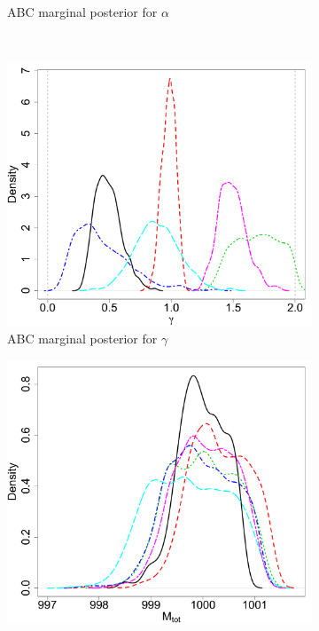 \documentclass[ejs]{imsart}
\numberwithin{equation}{section}
\theoremstyle{plain}
\begin{document}
\begin{figure}[htbp]
\begin{subfigure}{0.48\textwidth}
\caption{ABC marginal posterior for  $\alpha$}\label{subfig:marg_alpha} 
\end{subfigure} \\
\begin{subfigure}{0.48\textwidth}
\centering
\includegraphics[width = \textwidth]{figures/marg_gamma.pdf} 
\caption{ABC marginal posterior for $\gamma$}\label{subfig:marg_gamma}
\end{subfigure}
\begin{subfigure}{0.48\textwidth}
\centering
\includegraphics[width = \textwidth]{figures/marg_mtot.pdf} 

\end{subfigure}
\end{figure}
\end{document}
